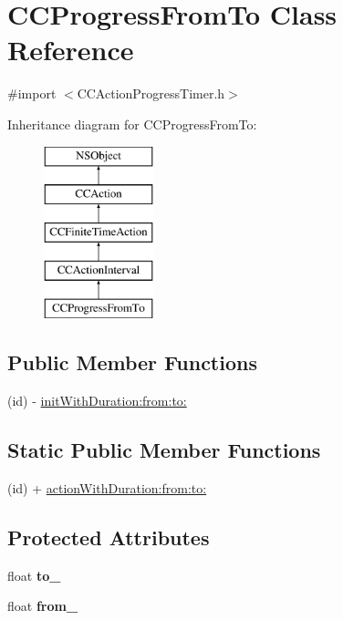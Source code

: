 \hypertarget{interface_c_c_progress_from_to}{\section{C\-C\-Progress\-From\-To Class Reference}
\label{interface_c_c_progress_from_to}
}


{\ttfamily \#import $<$C\-C\-Action\-Progress\-Timer.\-h$>$}

Inheritance diagram for C\-C\-Progress\-From\-To\-:\begin{figure}[H]
\begin{center}
\leavevmode
\includegraphics[height=5.000000cm]{interface_c_c_progress_from_to}
\end{center}
\end{figure}
\subsection*{Public Member Functions}
\begin{DoxyCompactItemize}
\item 
(id) -\/ \hyperlink{interface_c_c_progress_from_to_ae3dba5d6d303a02665d0b2a3130cff54}{init\-With\-Duration\-:from\-:to\-:}
\end{DoxyCompactItemize}
\subsection*{Static Public Member Functions}
\begin{DoxyCompactItemize}
\item 
(id) + \hyperlink{interface_c_c_progress_from_to_a03e2c6358b18b886235f60bd13b718b3}{action\-With\-Duration\-:from\-:to\-:}
\end{DoxyCompactItemize}
\subsection*{Protected Attributes}
\begin{DoxyCompactItemize}
\item 
\hypertarget{interface_c_c_progress_from_to_a28ce1716b8f1e62ea5030bb38be10c54}{float {\bfseries to\-\_\-}}\label{interface_c_c_progress_from_to_a28ce1716b8f1e62ea5030bb38be10c54}

\item 
\hypertarget{interface_c_c_progress_from_to_a69a53ffd582d5b1c785d982f31bf7bb3}{float {\bfseries from\-\_\-}}\label{interface_c_c_progress_from_to_a69a53ffd582d5b1c785d982f31bf7bb3}

\end{DoxyCompactItemize}


